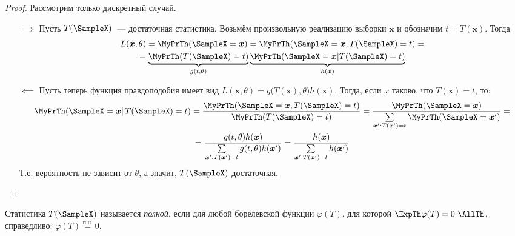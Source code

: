 \begin{proof}
    Рассмотрим только дискретный случай. 
    \begin{enumerate}
        \item[$\implies$] Пусть $T(\SampleX)$~--- достаточная статистика. 
            Возьмём произвольную реализацию выборки $\boldsymbol{x}$ и обозначим $t = T(\boldsymbol{x})$. Тогда
            \begin{multline*}
                L(\boldsymbol{x}, \theta) = \MyPrTh (\SampleX=\boldsymbol{x})=\MyPrTh (\SampleX=\boldsymbol{x}, T(\SampleX)=t) =\\
                = \underbrace{\MyPrTh (T(\SampleX)=t)}_{g(t, \theta)} \underbrace{\MyPrTh (\SampleX=\boldsymbol{x} | T(\SampleX)=t)}_{h(\boldsymbol{x})}
            \end{multline*}
        \item[$\impliedby$] Пусть теперь функция правдоподобия имеет вид $L(\boldsymbol{x}, \theta)=g\bigl(T(\boldsymbol{x}), \theta\bigr) h(\boldsymbol{x})$. 
            Тогда, если $x$ таково, что $T(\boldsymbol{x})=t$, то:
            \begin{multline*}
                \MyPrTh (\SampleX=\boldsymbol{x} | \, T(\SampleX)=t) =\frac{\MyPrTh (\SampleX=\boldsymbol{x}, T(\SampleX)=t)}{\MyPrTh (T(\SampleX)=t)}
                =\frac{\MyPrTh (\SampleX=\boldsymbol{x})}{\sum\limits_{\boldsymbol{x}^{\prime}: T(\boldsymbol{x}^{\prime})=t} \MyPrTh(\SampleX=\boldsymbol{x}^{\prime})} = \\
                = \frac{g(t, \theta) h(\boldsymbol{x})}{\sum\limits_{\boldsymbol{x}^{\prime}: T(\boldsymbol{x}^{\prime})=t} g(t, \theta) h(\boldsymbol{x}^{\prime})}
                = \frac{h(\boldsymbol{x})}{\sum\limits_{\boldsymbol{x}^{\prime}: T(\boldsymbol{x}^{\prime})=t} h(\boldsymbol{x}^{\prime})}
            \end{multline*}
            Т.е. вероятность не зависит от $\theta$, а значит, $T(\SampleX)$ достаточная.
    \end{enumerate}
\end{proof}

\begin{defn}
    Статистика $T(\SampleX)$ называется \textit{полной}, если для любой борелевской функции $\varphi(T)$, для которой $\ExpTh \varphi(T)=0~\AllTh$, справедливо: $\varphi(T) \stackrel{\text{п.н.}}{=}0$.
\end{defn}

